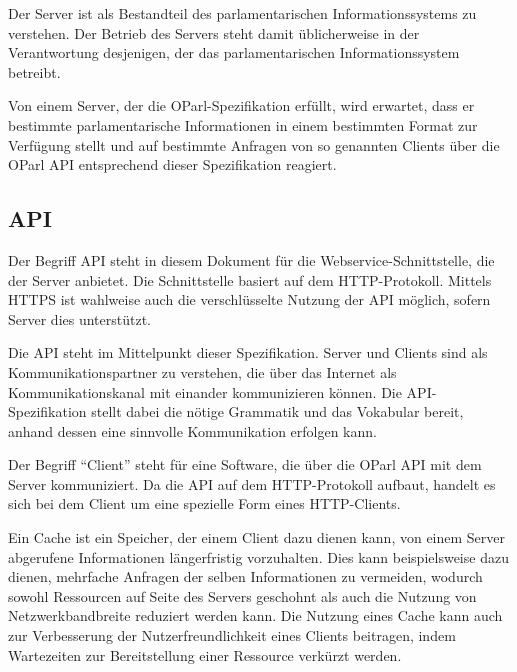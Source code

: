 \documentclass[,a4paper]{article}
\begin{document}
Der Server ist als Bestandteil des parlamentarischen Informationssystems
zu verstehen. Der Betrieb des Servers steht damit üblicherweise in der
Verantwortung desjenigen, der das parlamentarischen Informationssystem
betreibt.

Von einem Server, der die OParl-Spezifikation erfüllt, wird erwartet,
dass er bestimmte parlamentarische Informationen in einem bestimmten
Format zur Verfügung stellt und auf bestimmte Anfragen von so genannten
Clients über die OParl API entsprechend dieser Spezifikation reagiert.

\subsection{API}

Der Begriff API steht in diesem Dokument für die
Webservice-Schnittstelle, die der Server anbietet. Die Schnittstelle
basiert auf dem HTTP-Protokoll. Mittels HTTPS ist wahlweise auch die
verschlüsselte Nutzung der API möglich, sofern Server dies unterstützt.

Die API steht im Mittelpunkt dieser Spezifikation. Server und Clients
sind als Kommunikationspartner zu verstehen, die über das Internet als
Kommunikationskanal mit einander kommunizieren können. Die
API-Spezifikation stellt dabei die nötige Grammatik und das Vokabular
bereit, anhand dessen eine sinnvolle Kommunikation erfolgen kann.


Der Begriff ``Client'' steht für eine Software, die über die OParl API
mit dem Server kommuniziert. Da die API auf dem HTTP-Protokoll aufbaut,
handelt es sich bei dem Client um eine spezielle Form eines
HTTP-Clients.


Ein Cache ist ein Speicher, der einem Client dazu dienen kann, von einem
Server abgerufene Informationen längerfristig vorzuhalten. Dies kann
beispielsweise dazu dienen, mehrfache Anfragen der selben Informationen
zu vermeiden, wodurch sowohl Ressourcen auf Seite des Servers geschohnt
als auch die Nutzung von Netzwerkbandbreite reduziert werden kann. Die
Nutzung eines Cache kann auch zur Verbesserung der Nutzerfreundlichkeit
eines Clients beitragen, indem Wartezeiten zur Bereitstellung einer
Ressource verkürzt werden.
\end{document}
